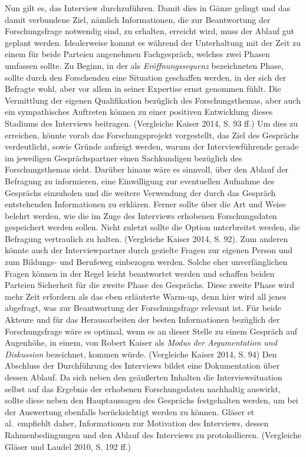 \documentclass[a4paper,
fontsize=11pt,
oneside,
numbers=noperiodatend,
parskip=half-,
bibliography=totoc,
final
]{scrartcl}
\begin{document}
Nun gilt es, das Interview durchzuführen. Damit dies in Gänze gelingt
und das damit verbundene Ziel, nämlich Informationen, die zur
Beantwortung der Forschungsfrage notwendig sind, zu erhalten, erreicht
wird, muss der Ablauf gut geplant werden. Idealerweise kommt es während
der Unterhaltung mit der Zeit zu einem für beide Parteien angenehmen
Fachgespräch, welches zwei Phasen umfassen sollte. Zu Beginn, in der als
\emph{Eröffnungssequenz} bezeichneten Phase, sollte durch den
Forschenden eine Situation geschaffen werden, in der sich der Befragte
wohl, aber vor allem in seiner Expertise ernst genommen fühlt. Die
Vermittlung der eigenen Qualifikation bezüglich des Forschungsthemas,
aber auch ein sympathisches Auftreten können zu einer positiven
Entwicklung dieses Stadiums des Interviews beitragen. (Vergleiche Kaiser
2014, S. 93 ff.) Um dies zu erreichen, könnte vorab das
Forschungsprojekt vorgestellt, das Ziel des Gesprächs verdeutlicht,
sowie Gründe aufzeigt werden, warum der Interviewführende gerade im
jeweiligen Gesprächspartner einen Sachkundigen bezüglich des
Forschungsthemas sieht. Darüber hinaus wäre es sinnvoll, über den Ablauf
der Befragung zu informieren, eine Einwilligung zur eventuellen Aufnahme
des Gesprächs einzuholen und die weitere Verwendung der durch das
Gespräch entstehenden Informationen zu erklären. Ferner sollte über die
Art und Weise belehrt werden, wie die im Zuge des Interviews erhobenen
Forschungsdaten gespeichert werden sollen. Nicht zuletzt sollte die
Option unterbreitet werden, die Befragung vertraulich zu halten.
(Vergleiche Kaiser 2014, S. 92). Zum anderen könnte auch der
Interviewpartner durch gezielte Fragen zur eigenen Person und zum
Bildungs- und Berufsweg einbezogen werden. Solche eher unverfänglichen
Fragen können in der Regel leicht beantwortet werden und schaffen beiden
Parteien Sicherheit für die zweite Phase des Gesprächs. Diese zweite
Phase wird mehr Zeit erfordern als das eben erläuterte Warm-up, denn
hier wird all jenes abgefragt, was zur Beantwortung der Forschungsfrage
relevant ist. Für beide Akteure und für das Herausarbeiten der besten
Informationen bezüglich der Forschungsfrage wäre es optimal, wenn es an
dieser Stelle zu einem Gespräch auf Augenhöhe, in einem, von Robert
Kaiser als \emph{Modus} \emph{der Argumentation und Diskussion}
bezeichnet, kommen würde. (Vergleiche Kaiser 2014, S. 94) Den Abschluss
der Durchführung des Interviews bildet eine Dokumentation über dessen
Ablauf. Da sich neben den geäußerten Inhalten die Interviewsituation
selbst auf das Ergebnis der erhobenen Forschungsdaten nachhaltig
auswirkt, sollte diese neben den Hauptaussagen des Gesprächs
festgehalten werden, um bei der Auswertung ebenfalls berücksichtigt
werden zu können. Gläser et al.~empfiehlt daher, Informationen zur
Motivation des Interviews, dessen Rahmenbedingungen und den Ablauf des
Interviews zu protokollieren. (Vergleiche Gläser und Laudel 2010, S. 192
ff.)
\end{document}
